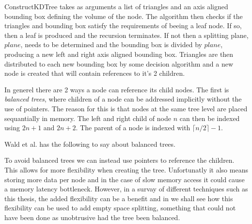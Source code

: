 ConstructKDTree takes as arguments a list of triangles and an axis
aligned bounding box defining the volume of the node. The algorithm
then checks if the triangles and bounding box satisfy the requirements
of beeing a leaf node. If so, then a leaf is produced and the
recursion terminates. If not then a splitting plane, $plane$, needs to
be determined and the bounding box is divided by $plane$, producing a
new left and right axis aligned bounding box. Triangles are then
distributed to each new bounding box by some decision algorithm and a
new node is created that will contain references to it's 2 children.



In generel there are 2 ways a node can reference its child nodes. The
first is \textit{balanced trees}, where children of a node can be
addressed implicitly without the use of pointers. The reason for this
is that nodes at the same tree level are placed sequantially in
memory. The left and right child of node $n$ can then be indexed using
$2n+1$ and $2n+2$. The parent of a node is indexed with $\lceil n/2
\rceil - 1$.


Wald et al. has the following to say about
balanced trees.



To avoid balanced trees we can instead use pointers to reference the
children. This allows for more flexibility when creating the tree.
Unfortunatly it also means storing more data per node and in the case
of slow memory access it could cause a memory latency
bottleneck. However, in a survay of different techniques such as this
thesis, the added flexibility can be a benefit and in
 we shall see how this flexibility can
be used to add empty space splitting, something that could not have
been done as unobtrusive had the tree been balanced.




